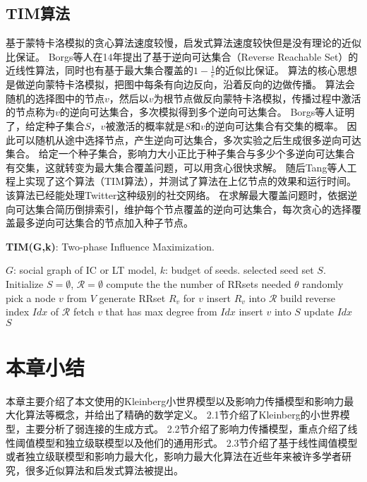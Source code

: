 \subsection{TIM算法}
基于蒙特卡洛模拟的贪心算法速度较慢，启发式算法速度较快但是没有理论的近似比保证。
Borgs等人\cite{borgs2014rrset}在14年提出了基于逆向可达集合（Reverse Reachable Set）的近线性算法，同时也有基于最大集合覆盖的$1-\frac{1}{e}$的近似比保证。
算法的核心思想是做逆向蒙特卡洛模拟，把图中每条有向边反向，沿着反向的边做传播。
算法会随机的选择图中的节点$v$，然后以$v$为根节点做反向蒙特卡洛模拟，传播过程中激活的节点称为$v$的逆向可达集合，多次模拟得到多个逆向可达集合。
Borgs等人证明了，给定种子集合$S$，$v$被激活的概率就是$S$和$v$的逆向可达集合有交集的概率。
因此可以随机从途中选择节点，产生逆向可达集合，多次实验之后生成很多逆向可达集合。
给定一个种子集合，影响力大小正比于种子集合与多少个多逆向可达集合有交集，这就转变为最大集合覆盖问题，可以用贪心很快求解。
随后Tang等人\cite{tang2014newrrset}工程上实现了这个算法（TIM算法），并测试了算法在上亿节点的效果和运行时间。该算法已经能处理Twitter这种级别的社交网络。
在求解最大覆盖问题时，依据逆向可达集合简历倒排索引，维护每个节点覆盖的逆向可达集合，每次贪心的选择覆盖最多逆向可达集合的节点加入种子节点。

\begin{algorithm}
	\caption{\textbf{TIM(G,k)}: Two-phase Influence Maximization.}
	\label{alg:tim} 
	\begin{algorithmic}[1]
		\Require $G$: social graph of IC or LT model, $k$: budget of seeds.
		\Ensure selected seed set $S$.
		\State Initialize $S = \emptyset$, $\mathcal{R} = \emptyset$
		\State compute the the number of RRsets needed $\theta$
			\State randomly pick a node $v$ from $V$
			\State generate RRset $R_v$ for $v$
			\State insert $R_v$ into $\mathcal{R}$
		\EndFor
		\State build reverse index $Idx$ of $\mathcal{R}$
			\State fetch $v$ that has max degree from $Idx$
			\State insert $v$ into $S$
			\State update $Idx$
		\EndFor
		\State \Return $S$
	\end{algorithmic} 
\end{algorithm}

\section{本章小结}
本章主要介绍了本文使用的Kleinberg小世界模型以及影响力传播模型和影响力最大化算法等概念，并给出了精确的数学定义。
2.1节介绍了Kleinberg的小世界模型，主要分析了弱连接的生成方式。
2.2节介绍了影响力传播模型，重点介绍了线性阈值模型和独立级联模型以及他们的通用形式。
2.3节介绍了基于线性阈值模型或者独立级联模型和影响力最大化，影响力最大化算法在近些年来被许多学者研究，很多近似算法和启发式算法被提出。


